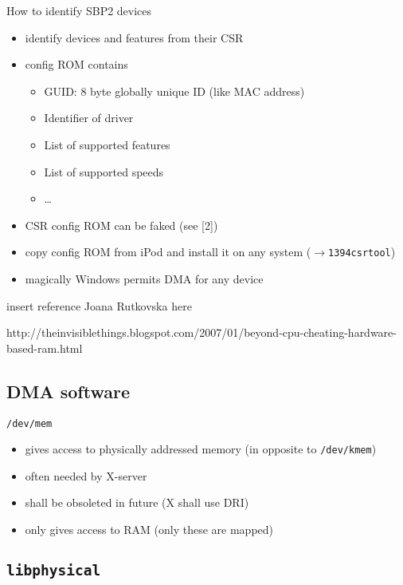 \documentclass{beamer}
\newenvironment{itemizeframe}[1]
  {\begin{frame}{#1}\startitemizeframe}
  {\stopitemizeframe\end{frame}}
\newcommand\startitemizeframe{\begin{itemize}}
\newcommand\stopitemizeframe{\end{itemize}}
\begin{document}
		\begin{itemizeframe}{How to identify SBP2 devices}
			\item identify devices and features from their CSR 
			\item config ROM contains
			\begin{itemize}
				\item GUID: 8 byte globally unique ID (like MAC address)
				\item Identifier of driver
				\item List of supported features
				\item List of supported speeds
				\item \ldots
			\end{itemize}
			\item<2-> CSR config ROM can be faked (see [2])
			\item<3-> copy config ROM from iPod and install it on any system ($\rightarrow$\texttt{1394csrtool})
			\item<4-> magically Windows permits DMA for \alert{any} device
		\end{itemizeframe}

		\begin{frame}
			\alert{insert reference Joana Rutkovska here}

			http://theinvisiblethings.blogspot.com/2007/01/beyond-cpu-cheating-hardware-based-ram.html
		\end{frame}
		
	\subsection{DMA software}

		\begin{itemizeframe}{\texttt{/dev/mem}}
			\item gives access to physically addressed memory (in opposite to \texttt{/dev/kmem})
			\item often needed by X-server
			\item shall be obsoleted in future (X shall use DRI)
			\item only gives access to  RAM (only these are mapped)
		\end{itemizeframe}

	\subsection{\texttt{libphysical}}
\end{document}
